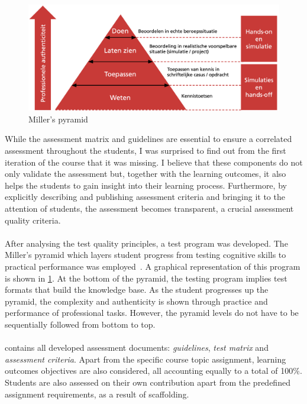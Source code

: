 

\begin{figure}
    \centering
    \includegraphics[width=\textwidth]{figures/miller_pyramid.png}
    \caption{Miller's pyramid~\cite{toetskwaliteit2014}}
    \label{fig:miller}
\end{figure}

While the assessment matrix and guidelines are essential to ensure a correlated assessment throughout the students, I was surprised to find out from the first iteration of the course that it was missing. 
I believe that these components do not only validate the assessment but, together with the learning outcomes, it also helps the students to gain insight into their learning process. 
Furthermore, by explicitly describing and publishing assessment criteria and bringing it to the attention of students, the assessment becomes transparent, a crucial assessment quality criteria.
\\\\
After analysing the test quality principles, a test program was developed. The Miller's pyramid which layers student progress from testing cognitive skills to practical performance was employed~\cite{toetskwaliteit2014}. 
A graphical representation of this program is shown in \cref{fig:miller}. 
At the bottom of the pyramid, the testing program implies test formats that build the knowledge base.
As the student progresses up the pyramid, the complexity and authenticity is shown through practice and performance of professional tasks.
However, the pyramid levels do not have to be sequentially followed from bottom to top. 
\\\\
 contains all developed assessment documents: \textit{guidelines}, \textit{test matrix} and \textit{assessment criteria}. Apart from the specific course topic assignment, learning outcomes objectives are also considered, all accounting equally to a total of 100\%. 
Students are also assessed on their own contribution apart from the predefined assignment requirements, as a result of \gls{scaffolding}.

